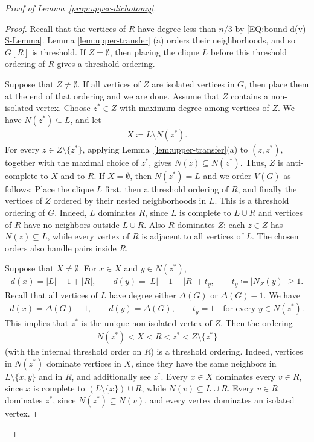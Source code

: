 \documentclass[10pt,a4paper]{article}
\begin{document}
\begin{proof}[Proof of Lemma~\ref{prop:upper-dichotomy}]
\begin{proof}
 
Recall that the vertices of $R$ have degree less than $n/3$ by \eqref{EQ:bound-d(v)-S-Lemma}. Lemma \ref{lem:upper-transfer} (a) orders their neighborhoods, and so  $G[R]$ is threshold.  If $Z=\emptyset$, then placing the clique $L$ before this threshold ordering of $R$ gives a threshold ordering.  

Suppose that $Z\neq \emptyset$. If all vertices of $Z$ are isolated vertices in $G$, then place them at the end of that ordering and we are done.  Assume that $Z$ contains a non-isolated vertex.  Choose $z^*\in Z$
    with maximum degree among vertices of $Z$. We have
    $N(z^*)\subseteq L$, and let
    \begin{align*}
      X\coloneqq L\setminus N(z^*).
    \end{align*}
    For every $z\in Z\setminus\{z^*\}$, applying
    Lemma~\ref{lem:upper-transfer}(a) to $(z,z^*)$, together with the maximal
    choice of $z^*$, gives $N(z)\subseteq N(z^*)$.  Thus, $Z$ is
    anti-complete to $X$ and to $R$.  If $X=\emptyset$, then $N(z^*)=L$ and we order $V(G)$ as follows: Place 
    the clique $L$ first, then a threshold ordering of $R$, and finally the
    vertices of $Z$ ordered by their nested neighborhoods in $L$.  This is a
    threshold ordering of $G$.  Indeed, $L$ dominates $R$, since $L$ is complete
    to $L\cup R$ and vertices of $R$ have no neighbors outside $L\cup R$.  Also
    $R$ dominates $Z$: each $z\in Z$ has $N(z)\subseteq L$, while every vertex of
    $R$ is adjacent to all vertices of $L$.  The chosen orders also handle pairs inside
    $R$.
    
Suppose that $X\ne\emptyset$. For $x\in X$ and $y\in N(z^*)$,
    \begin{align*}
      d(x)=|L|-1+|R|,
      \qquad
      d(y)=|L|-1+|R|+t_y,
      \qquad t_y\coloneqq|N_Z(y)|\ge1.
    \end{align*}
Recall that all vertices of $L$ have degree either $\Delta(G)$ or $\Delta(G)-1$. We have 
    \begin{align*}
      d(x)=\Delta(G)-1,
      \qquad
      d(y)=\Delta(G),
      \qquad
      t_y=1\quad\text{for every }y\in N(z^*).
    \end{align*}
This implies that $z^*$ is the unique non-isolated vertex of $Z$.  Then the ordering 
    \begin{align*}
      N(z^*)<X<R<z^*<Z\setminus\{z^*\}
    \end{align*}
    (with the internal threshold order on $R$) is a threshold ordering.  Indeed,
    vertices in $N(z^*)$ dominate vertices in $X$, since they have the same
    neighbors in $L\setminus\{x,y\}$ and in $R$, and additionally see $z^*$.
    Every $x\in X$ dominates every $v\in R$, since $x$ is complete to
    $(L\setminus\{x\})\cup R$, while $N(v)\subseteq L\cup R$.  Every $v\in R$
    dominates $z^*$, since $N(z^*)\subseteq N(v)$, and every vertex dominates an isolated vertex.  
\end{proof}


\end{proof}
\end{document}
